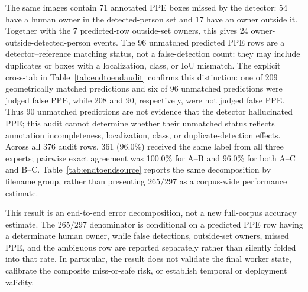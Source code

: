 \documentclass[iicol,pdflatex,sn-mathphys-num]{sn-jnl}
\begin{document}
The same images contain 71 annotated PPE boxes missed by the detector: 54 have a human owner in the detected-person set and 17 have an owner outside it. Together with the 7 predicted-row outside-set owners, this gives 24 owner-outside-detected-person events. The 96 unmatched predicted PPE rows are a detector--reference matching status, not a false-detection count: they may include duplicates or boxes with a localization, class, or IoU mismatch. The explicit cross-tab in Table~\ref{tab:endtoendaudit} confirms this distinction: one of 209 geometrically matched predictions and six of 96 unmatched predictions were judged false PPE, while 208 and 90, respectively, were not judged false PPE. Thus 90 unmatched predictions are not evidence that the detector hallucinated PPE; this audit cannot determine whether their unmatched status reflects annotation incompleteness, localization, class, or duplicate-detection effects. Across all 376 audit rows, 361 (96.0\%) received the same label from all three experts; pairwise exact agreement was 100.0\% for A--B and 96.0\% for both A--C and B--C. Table~\ref{tab:endtoendsource} reports the same decomposition by filename group, rather than presenting $265/297$ as a corpus-wide performance estimate.

This result is an end-to-end error decomposition, not a new full-corpus accuracy estimate. The $265/297$ denominator is conditional on a predicted PPE row having a determinate human owner, while false detections, outside-set owners, missed PPE, and the ambiguous row are reported separately rather than silently folded into that rate. In particular, the result does not validate the final worker state, calibrate the composite miss-or-safe risk, or establish temporal or deployment validity.
\end{document}
